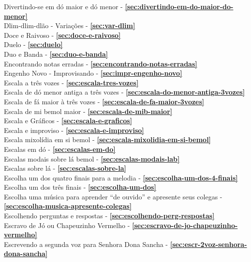 Divertindo-se em dó maior e dó menor - \textbf{\ref{sec:divertindo-em-do-maior-do-menor}} \\
Dlim-dlim-dlão - Variações - \textbf{\ref{sec:var-dlim}} \\
Doce e Raivoso - \textbf{\ref{sec:doce-e-raivoso}} \\
Duelo - \textbf{\ref{sec:duelo}} \\
Duo e Banda - \textbf{\ref{sec:duo-e-banda}} \\
Encontrando notas erradas - \textbf{\ref{sec:encontrando-notas-erradas}} \\
Engenho Novo - Improvisando - \textbf{\ref{sec:impr-engenho-novo}} \\
Escala a três vozes - \textbf{\ref{sec:escala-tres-vozes}} \\
Escala de dó menor antiga a três vozes - \textbf{\ref{sec:escala-do-menor-antiga-3vozes}} \\
Escala de fá maior à três vozes - \textbf{\ref{sec:escala-de-fa-maior-3vozes}} \\
Escala de mi bemol maior - \textbf{\ref{sec:escala-de-mib-maior}} \\
Escala e Gráficos - \textbf{\ref{sec:escala-e-graficos}} \\
Escala e improviso - \textbf{\ref{sec:escala-e-improviso}} \\
Escala mixolídia em si bemol - \textbf{\ref{sec:escala-mixolidia-em-si-bemol}} \\
Escalas em dó - \textbf{\ref{sec:escalas-em-do}} \\
Escalas modais sobre lá bemol - \textbf{\ref{sec:escalas-modais-lab}} \\
Escalas sobre lá - \textbf{\ref{sec:escalas-sobre-la}} \\
Escolha um dos quatro finais para a melodia - \textbf{\ref{sec:escolha-um-dos-4-finais}} \\
Escolha um dos três finais - \textbf{\ref{sec:escolha-um-dos}} \\
Escolha uma música para aprender ``de ouvido'' e apresente seus
colegas - \textbf{\ref{sec:escolha-musica-apresente-colegas}} \\
Escolhendo perguntas e respostas - \textbf{\ref{sec:escolhendo-perg-respostas}} \\
Escravo de Jó ou Chapeuzinho Vermelho - \textbf{\ref{sec:escravo-de-jo-chapeuzinho-vermelho}} \\
Escrevendo a segunda voz para Senhora Dona Sancha - \textbf{\ref{sec:escr-2voz-senhora-dona-sancha}} \\
